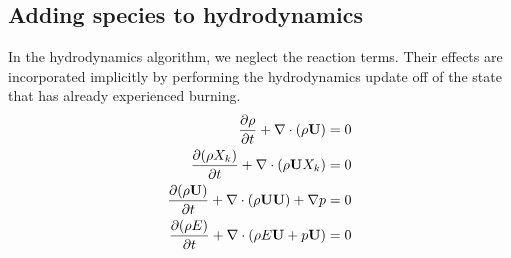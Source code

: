 \subsection{Adding species to hydrodynamics}

In the hydrodynamics algorithm, we neglect the reaction terms.  Their effects
are incorporated implicitly by performing the hydrodynamics update off of the 
state that has already experienced burning.
\begin{align}
{\frac{{\partial\rho}}{\partial t}} + \nabla \cdot (\rho {\bf U}) &= 0 \\
{\frac{{\partial(\rho X_k)}}{\partial t}} + \nabla \cdot (\rho {\bf U} X_k) &= 0 \\
{\frac{{\partial(\rho {\bf U})}}{\partial t}} + \nabla \cdot (\rho {\bf U} {\bf U}) + \nabla p &= 0 \\
{\frac{{\partial(\rho E)}}{\partial t}} + \nabla \cdot (\rho E {\bf U} + p {\bf U} ) &= 0
\end{align}




